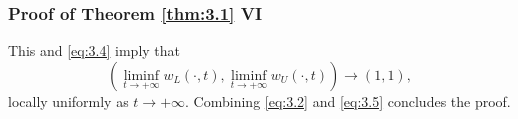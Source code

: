 
\begin{frame}
    \frametitle{Proof of Theorem \ref{thm:3.1} VI}
    \begin{proofe}
        This and \eqref{eq:3.4} imply that
        \begin{equation}
            (\liminf_{t \to +\infty} w_L(\cdot, t), \liminf_{t \to +\infty} w_U(\cdot, t)) \to (1, 1),
            \label{eq:3.5}
        \end{equation}
        locally uniformly as \(t \to +\infty\).
        Combining \eqref{eq:3.2} and \eqref{eq:3.5} concludes the proof.
    \end{proofe}
\end{frame}
        